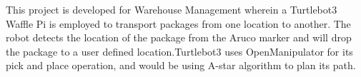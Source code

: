 This project is developed for Warehouse Management wherein a Turtlebot3 Waffle Pi is employed to transport packages from one location to another. The robot detects the location of the package from the Aruco marker and will drop the package to a user defined location.\+Turtlebot3 uses Open\+Manipulator for its pick and place operation, and would be using A-\/star algorithm to plan its path. 